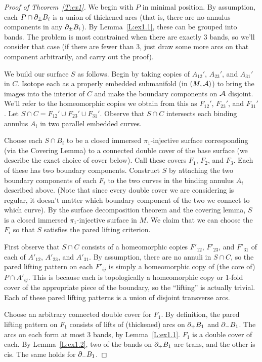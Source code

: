 \begin{proof}[Proof of Theorem~\ref{T:ex1}]

We begin with $P$ in minimal position. By assumption, each $P \cap \partial_\pm B_i$
is a union of thickened arcs (that is, there are no annulus components in any
$\partial_\pm B_i$). By Lemma~\ref{L:ex1.1}, these can be grouped into bands. The
problem is most constrained when there are exactly 3 bands, so we'll consider
that case (if there are fewer than 3, just draw some more arcs on that
component arbitrarily, and carry out the proof).

We build our surface $S$ as follows. Begin by taking copies of  $A_{12}'$,
$A_{23}'$, and $A_{31}'$ in $C$. Isotope each as a properly embedded
submanifold (in $(M,\mathcal{A})$) to bring the images into the interior of $C$ and
make the boundary components on $\mathcal{A}$ disjoint. We'll refer to the homeomorphic
copies we obtain from this as $F_{12}'$, $F_{23}'$, and $F_{31}'$. Let $S\cap
C = F_{12}' \cup F_{23}' \cup F_{31}'$. Observe that $S\cap C$ intersects each
binding annulus $A_i$ in two parallel embedded curves.

Choose each $S \cap B_i$ to be a closed immersed $\pi_1$-injective surface
corresponding (via the Covering Lemma) to a connected double cover of the base
surface (we describe the exact choice of cover below). Call these covers $F_1$,
$F_2$, and $F_3$.  Each of these has two boundary components. Construct $S$ by
attaching the two boundary components of each $F_i$ to the two curves in the
binding annulus $A_i$ described above. (Note that since every double cover we
are considering is regular, it doesn't matter which boundary component of the
two we connect to which curve). By the surface decomposition theorem and the
covering lemma, $S$ is a closed immersed $\pi_1$-injective surface in $M$.  We
claim that we can choose the $F_i$ so that $S$ satisfies the pared lifting
criterion.

First observe that $S \cap C$ consists of a homeomorphic copies $F'_{12}$,
$F'_{23}$, and $F'_{31}$ of each of $A'_{12}$, $A'_{23}$, and $A'_{31}$. By
assumption, there are no annuli in $S \cap C$, so the pared lifting pattern on
each $F'_{ij}$ is simply a homeomorphic copy of (the core of) $P \cap A'_{ij}$.
This is because each is topologically a homeomorphic copy or 1-fold cover of
the appropriate piece of the boundary, so the ``lifting'' is actually trivial.
Each of these pared lifting patterns is a union of disjoint transverse arcs.

Choose an arbitrary connected double cover for $F_1$. By definition, the pared
lifting pattern on $F_1$ consists of lifts of (thickened) arcs on $\partial_+ B_1$
and $\partial_- B_1$. The arcs on each form at most 3 bands, by Lemma~\ref{L:ex1.1}.
$F_1$ is a double cover of each.  By Lemma~\ref{L:ex1.2}, two of the bands on
$\partial_+B_1$ are trans, and the other is cis. The same holds for $\partial_-B_1$.


\end{proof}
